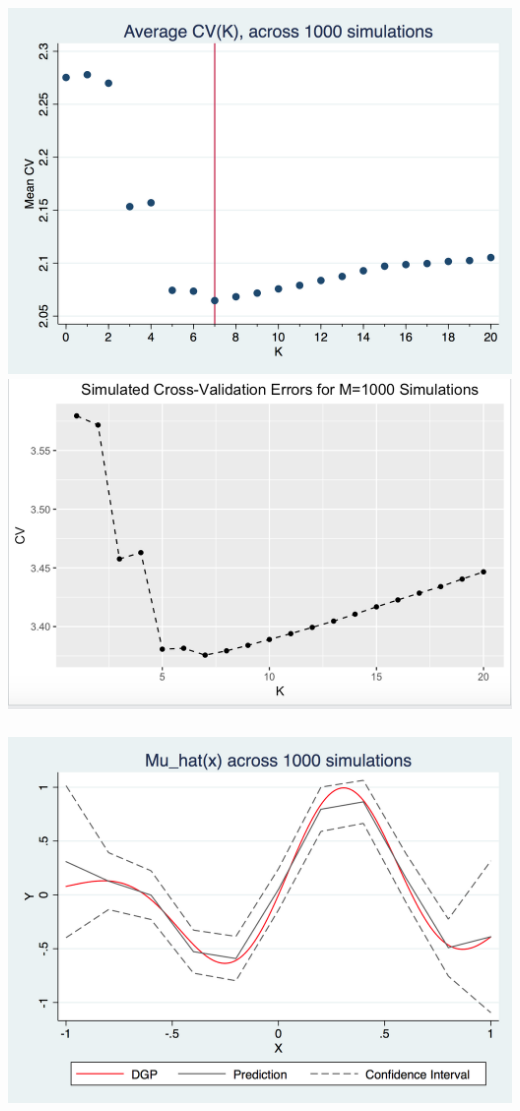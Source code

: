 \documentclass[12pt]{article}
\begin{document}
\subsubsection{}
\includegraphics[totalheight=4cm]{pset2q2b.png}
\includegraphics[totalheight=4cm]{pset2q2c_r.png}
\subsubsection{}
\includegraphics[totalheight=4cm]{pset2q2c.png}
\end{document}
